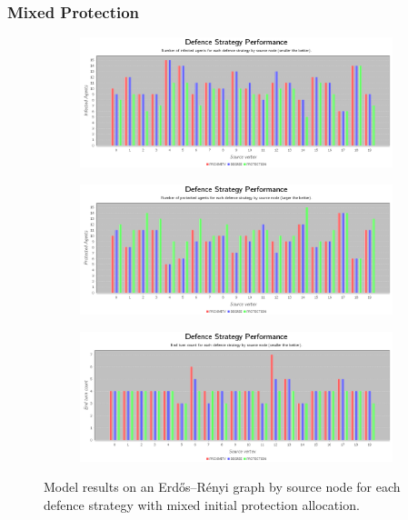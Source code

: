 \documentclass[results.tex]{subfiles}
\begin{document}
\newpage


\subsubsection{Mixed Protection}



\newpage

\begin{figure}[!ht]
\centering
     \begin{subfigure}[b]{0.9\textwidth}
         \centering
         \includegraphics[width=\textwidth]{Mixed/MixedInfectedChart}
         \label{fig:er-mix-infected}
     \end{subfigure}
     \vfill
     \begin{subfigure}[b]{0.9\textwidth}
         \centering
         \includegraphics[width=\textwidth]{Mixed/MixedProtectedChart}
         \label{fig:er-mix-protected}
     \end{subfigure}
     \vfill
     \begin{subfigure}[b]{0.9\textwidth}
         \centering
         \includegraphics[width=\textwidth]{Mixed/MixedEndTurnChart}
         \label{fig:er-mix-end}
     \end{subfigure}
        \caption{Model results on an Erdős–Rényi graph by source node for each defence strategy with mixed initial protection allocation.}
        \label{fig:er-mix-charts}
\end{figure}
\end{document}
